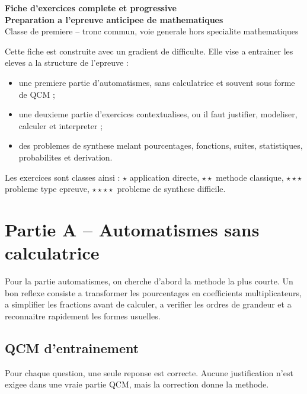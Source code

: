 \documentclass[11pt,a4paper]{article}
\newcommand{\etoile}{\ensuremath{\star}}
\newcommand{\deuxetoiles}{\ensuremath{\star\star}}
\newcommand{\troisetoiles}{\ensuremath{\star\star\star}}
\newcommand{\quatretoiles}{\ensuremath{\star\star\star\star}}
\begin{document}
\begin{center}
{\Large\bfseries Fiche d'exercices complete et progressive}\\[0.2cm]
{\LARGE\bfseries Preparation a l'epreuve anticipee de mathematiques}\\[0.2cm]
{\large Classe de premiere -- tronc commun, voie generale hors specialite mathematiques}\\[0.2cm]
\end{center}

\begin{objectifbox}
Cette fiche est construite avec un gradient de difficulte. Elle vise a entrainer les eleves a la structure de l'epreuve :
\begin{itemize}
    \item une premiere partie d'automatismes, sans calculatrice et souvent sous forme de QCM ;
    \item une deuxieme partie d'exercices contextualises, ou il faut justifier, modeliser, calculer et interpreter ;
    \item des problemes de synthese melant pourcentages, fonctions, suites, statistiques, probabilites et derivation.
\end{itemize}
Les exercices sont classes ainsi : \etoile{} application directe, \deuxetoiles{} methode classique, \troisetoiles{} probleme type epreuve, \quatretoiles{} probleme de synthese difficile.
\end{objectifbox}

\tableofcontents
\newpage

\section{Partie A -- Automatismes sans calculatrice}

\begin{methodebox}
Pour la partie automatismes, on cherche d'abord la methode la plus courte. Un bon reflexe consiste a transformer les pourcentages en coefficients multiplicateurs, a simplifier les fractions avant de calculer, a verifier les ordres de grandeur et a reconnaitre rapidement les formes usuelles.
\end{methodebox}

\subsection{QCM d'entrainement}
Pour chaque question, une seule reponse est correcte. Aucune justification n'est exigee dans une vraie partie QCM, mais la correction donne la methode.
\end{document}
